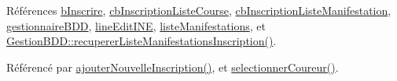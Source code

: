 Références \hyperlink{class_i_h_m_gestion_cross_a1afbc04ebd42deafebbbdc998d0fc246}{b\+Inscrire}, \hyperlink{class_i_h_m_gestion_cross_aff44e6f1a225ee5b55783afe72049f83}{cb\+Inscription\+Liste\+Course}, \hyperlink{class_i_h_m_gestion_cross_a317ffd7cc1c9aa5d6e55c53568e44f98}{cb\+Inscription\+Liste\+Manifestation}, \hyperlink{class_i_h_m_gestion_cross_a440bac63a3e51db3e2c08e883f8cafc9}{gestionnaire\+B\+DD}, \hyperlink{class_i_h_m_gestion_cross_ab6c32fd079f81c4fa0b9ec0b4ef9bb61}{line\+Edit\+I\+NE}, \hyperlink{class_i_h_m_gestion_cross_ac42ca910fa9802b3f63e3393aaa14e8a}{liste\+Manifestations}, et \hyperlink{class_gestion_b_d_d_a6c1ab5e51fbd6c92bb096badbeac0df5}{Gestion\+B\+D\+D\+::recuperer\+Liste\+Manifestations\+Inscription()}.



Référencé par \hyperlink{class_i_h_m_gestion_cross_af0165d32344af78b4edce59f88c90ff6}{ajouter\+Nouvelle\+Inscription()}, et \hyperlink{class_i_h_m_gestion_cross_ad71963d500fd61995fdae94e833db163}{selectionner\+Coureur()}.


